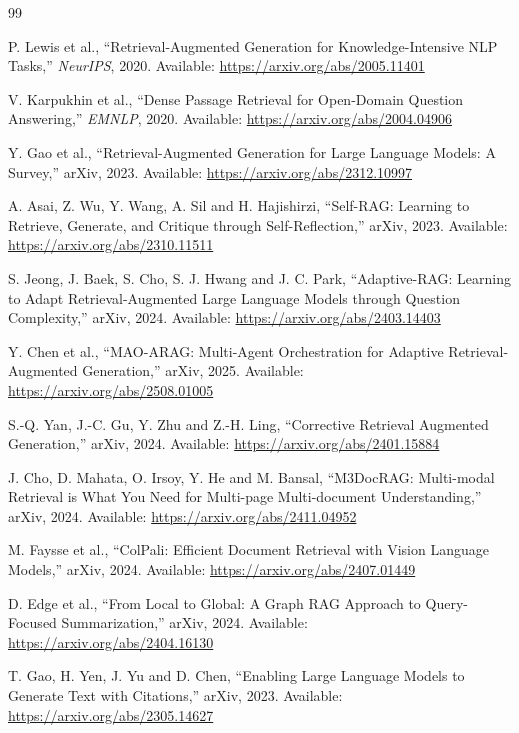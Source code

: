 \documentclass[a4paper,11pt]{article}
\begin{document}
\begin{thebibliography}{99}
\small

P. Lewis et al., ``Retrieval-Augmented Generation for Knowledge-Intensive NLP Tasks,'' \textit{NeurIPS}, 2020. Available: \url{https://arxiv.org/abs/2005.11401}

V. Karpukhin et al., ``Dense Passage Retrieval for Open-Domain Question Answering,'' \textit{EMNLP}, 2020. Available: \url{https://arxiv.org/abs/2004.04906}

Y. Gao et al., ``Retrieval-Augmented Generation for Large Language Models: A Survey,'' arXiv, 2023. Available: \url{https://arxiv.org/abs/2312.10997}

A. Asai, Z. Wu, Y. Wang, A. Sil and H. Hajishirzi, ``Self-RAG: Learning to Retrieve, Generate, and Critique through Self-Reflection,'' arXiv, 2023. Available: \url{https://arxiv.org/abs/2310.11511}

S. Jeong, J. Baek, S. Cho, S. J. Hwang and J. C. Park, ``Adaptive-RAG: Learning to Adapt Retrieval-Augmented Large Language Models through Question Complexity,'' arXiv, 2024. Available: \url{https://arxiv.org/abs/2403.14403}

Y. Chen et al., ``MAO-ARAG: Multi-Agent Orchestration for Adaptive Retrieval-Augmented Generation,'' arXiv, 2025. Available: \url{https://arxiv.org/abs/2508.01005}

S.-Q. Yan, J.-C. Gu, Y. Zhu and Z.-H. Ling, ``Corrective Retrieval Augmented Generation,'' arXiv, 2024. Available: \url{https://arxiv.org/abs/2401.15884}

J. Cho, D. Mahata, O. Irsoy, Y. He and M. Bansal, ``M3DocRAG: Multi-modal Retrieval is What You Need for Multi-page Multi-document Understanding,'' arXiv, 2024. Available: \url{https://arxiv.org/abs/2411.04952}

M. Faysse et al., ``ColPali: Efficient Document Retrieval with Vision Language Models,'' arXiv, 2024. Available: \url{https://arxiv.org/abs/2407.01449}

D. Edge et al., ``From Local to Global: A Graph RAG Approach to Query-Focused Summarization,'' arXiv, 2024. Available: \url{https://arxiv.org/abs/2404.16130}

T. Gao, H. Yen, J. Yu and D. Chen, ``Enabling Large Language Models to Generate Text with Citations,'' arXiv, 2023. Available: \url{https://arxiv.org/abs/2305.14627}


\end{thebibliography}
\end{document}
